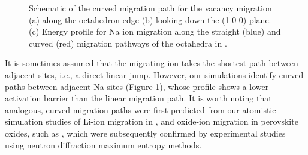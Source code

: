 \documentclass[12pt]{report}
\begin{document}
\begin{figure}
\centering
    \hspace{0.5cm}
    \hspace{0.5cm}
\caption{Schematic of the curved migration path for the  vacancy migration (a) along the  octahedron edge (b) looking down the (1 0 0) plane. (c) Energy profile for Na ion migration along the straight (blue) and curved (red) migration pathways of the  octahedra in .}
\label{migration}
\end{figure}

It is sometimes assumed that the migrating ion takes the shortest path between adjacent sites, i.e., a direct linear jump. 
However, our simulations identify curved paths between adjacent Na sites (Figure \ref{migration}), whose profile shows a lower activation barrier than the linear migration path.
It is worth noting that analogous, curved migration paths were first predicted from our atomistic simulation studies of Li-ion migration in ,\cite{islam2005} and oxide-ion migration in perovskite oxides, such as ,\cite{khan1998} which were subsequently confirmed by experimental studies using neutron diffraction maximum entropy methods.\cite{nishimura2008, yashima2003}
\end{document}
